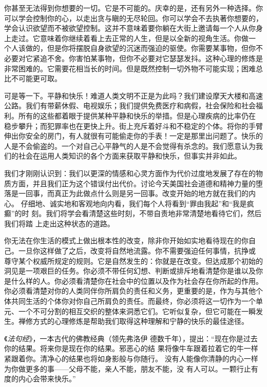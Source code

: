 你甚至无法得到你想要的一切。它是不可能的。庆幸的是，还有另外一种选择。你
可以学会控制你的心，以走出贪与瞋的无尽轮回。你可以学会不去执著你想要的，
学会认识欲望而不被欲望控制。这并不意味着要你躺在大街上邀请每一个人从你身
上走过。它意味着你继续着看上去正常的人生，但是以全新的视角生活。你做\1一
个人该做的，但是你将摆脱自身欲望的沉迷而强迫的驱使。你需要某事物，但你不
必要对它紧追不舍。你害怕某事物，但你不必要对它瑟瑟发抖。这种心理的修炼是
非常困难的。它需要花相当长的时间。但是既然控制一切外物不可能实现；困难总
比不可能更可取。

可是等一下。平静和快乐！难道人类文明不正是为此吗？我们建设摩天大楼和高速
公路。我们有带薪休假、电视娱乐；我们提供免费医疗和病假，社会保险和社会福
利。所有的这些都着眼于提供某种平静和快乐的举措。但是心理疾病的比率仍在
稳步攀升；而犯罪率也在更快上升。街上充斥着好斗和不稳定的个体。将你的手臂
伸出你安全的房门，有人就很有可能偷走你的手表！一定是那里出问题了。快乐的
人是不会偷盗的。一个对自己心平静气的人是不会觉得有杀念的。我们愿意认为我
们的社会在运用人类知识的各个方面来获取平静和快乐，但事实并非如此。

我们才刚刚认识到：我们以更深的情感和心灵方面作为代价过度地发展了存在的物
质方面，并且我们正为这个错误付出代价。讨论今天美国社会道德和精神力量的堕
落是一回事，而真正为此做点什么则是另一回事。改变开始的地方就在我们的内心。
仔细地、诚实地和客观地向内看，我们每个人将看到“罪由我起”和“我是疯癫”的时
刻。我们将学会看清楚这些时刻，不带自责地非常清楚地看待它们，然后我们将踏
上走出这种状态的道路。

你无法在你生活的模式上做出根本性的改变，除非你开始如实地看待现在的你自
己。一旦你这样做了之后，\1改变将自然地流露。你不需要强迫任何事情，抗挣或
尊守某个权威所规定的规则。它是自然发生的：你就是在改变。但达成那个初始的
洞见是一项艰巨的任务。你必须不带任何幻想、判断或排斥地看清楚你是谁以及你
是什么样的人。你必须看清楚你在社会中的位置以及作为社会存在你所起的作用。
你必须看清楚对你的人类同伴你所肩负的责任和义务，更重要的是，作为与其他个
体共同生活的个体你对你自己所肩负的责任。而最终，你必须将这一切作为一个单
元、一个不可分割的相互交织的整体来洞悉它们。它听似复杂，但它可能在一瞬发
生。禅修方式的心理修炼是帮助我们取得这种理解和宁静的快乐的最佳途径。

《{\it 法句经}》，一本古代的佛教经典（领先弗洛伊
德数千年），提出：“现在你是过去你的结果。将来你是现在你的结果。邪恶心的结
果将像牛车跟着拉着它的牛一样紧跟着你。清净心的结果也将如身影般与你随行。
没有人能像你清静的内心一样为你做更多的事——父母不能，亲人不能，朋友不能，没
有人可以。一颗行止有度的内心会带来快乐。”



\endchapter

\vfill\eject\byebye
